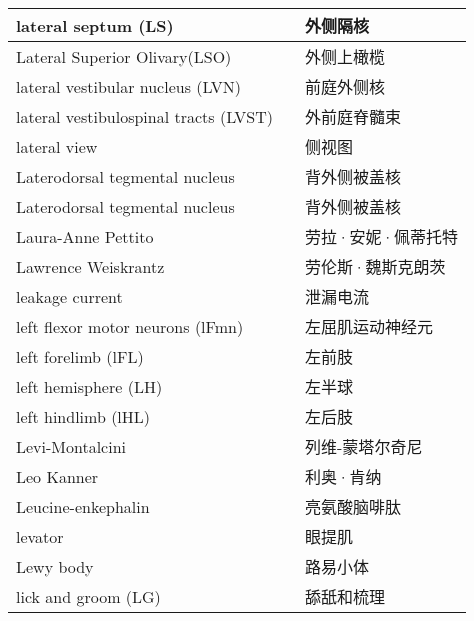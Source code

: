 \begin{longtable}{lll}
	\midrule
	lateral septum (LS)  && 外侧隔核  \\
	
	\midrule
	Lateral Superior Olivary(LSO)   && 外侧上橄榄  \\
	
	\midrule
	lateral vestibular nucleus (LVN)  && 前庭外侧核  \\
	
	\midrule
	lateral vestibulospinal tracts (LVST)  && 外前庭脊髓束  \\
	
	\midrule
	lateral view   && 侧视图  \\
	
	\midrule
	Laterodorsal tegmental nucleus   && 背外侧被盖核  \\
	
	\midrule
	Laterodorsal tegmental nucleus   && 背外侧被盖核  \\
	
	\midrule
	Laura-Anne Pettito   && 劳拉·安妮·佩蒂托特  \\
	
	\midrule
	Lawrence Weiskrantz   && 劳伦斯·魏斯克朗茨  \\
	
	\midrule
	leakage current   && 泄漏电流  \\
	
	\midrule
	left flexor motor neurons (lFmn)   && 左屈肌运动神经元  \\
	
	\midrule
	left forelimb (lFL)   && 左前肢  \\
	
	\midrule
	left hemisphere (LH)  && 左半球  \\
	
	\midrule
	left hindlimb (lHL)   && 左后肢  \\
	
	\midrule
	Levi-Montalcini   && 列维-蒙塔尔奇尼  \\
	
	\midrule
	Leo Kanner   && 利奥·肯纳  \\
	
	\midrule
	Leucine-enkephalin   && 亮氨酸脑啡肽  \\
	
	\midrule
	levator   && 眼提肌  \\
	
	\midrule
	Lewy body   && 路易小体  \\
	
	\midrule
	lick and groom (LG)  && 舔舐和梳理  \\
	

\end{longtable}
